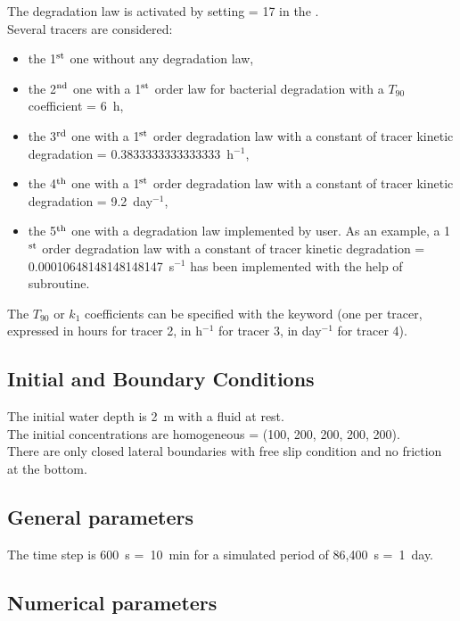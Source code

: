 The degradation law is activated by setting  = 17
in the  .\\

Several tracers are considered:
\begin{itemize}
\item the 1$^{\rm{st}}$ one without any degradation law,
\item the 2$^{\rm{nd}}$ one with a 1$^{\rm{st}}$ order law for bacterial
  degradation with a $T_{90}$ coefficient = 6~h,
\item the 3$^{\rm{rd}}$ one with a 1$^{\rm{st}}$ order degradation law with
  a constant of tracer kinetic degradation = 0.3833333333333333~h$^{-1}$,
\item the 4$^{\rm{th}}$ one with a 1$^{\rm{st}}$ order degradation law with
  a constant of tracer kinetic degradation = 9.2~day$^{-1}$,
\item the 5$^{\rm{th}}$ one with a degradation law implemented by user.
  As an example, a 1$^{\rm{st}}$ order degradation law with
  a constant of tracer kinetic degradation = 0.00010648148148148147~s$^{-1}$
  has been implemented
  with the help of  subroutine.
\end{itemize}

The $T_{90}$ or $k_1$ coefficients can be specified with the keyword
(one per tracer, expressed in hours for tracer 2, in h$^{-1}$ for tracer 3,
in day$^{-1}$ for tracer 4).

\subsection{Initial and Boundary Conditions}

The initial water depth is 2~m with a fluid at rest.\\
%
The initial concentrations are homogeneous
= (100, 200, 200, 200, 200).\\
%
There are only closed lateral boundaries with free slip condition and no
friction at the bottom.

\subsection{General parameters}

The time step is 600~s =~10~min for a simulated period of 86,400~s =~1~day.

\subsection{Numerical parameters}


